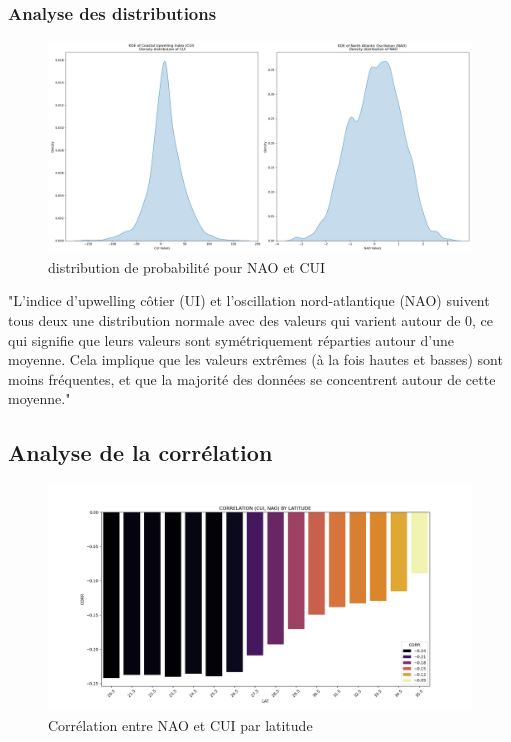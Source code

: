 \subsubsection{Analyse des distributions}

\begin{figure}[H]
\centering
\includegraphics[scale=0.3]{kde_nao_cui.png}
\caption{distribution de probabilité pour NAO et CUI}
\end{figure}

"L'indice d'upwelling côtier (UI) et l'oscillation nord-atlantique (NAO) suivent tous deux une distribution normale avec des valeurs qui varient autour de 0, ce qui signifie que leurs valeurs sont symétriquement réparties autour d'une moyenne. Cela implique que les valeurs extrêmes (à la fois hautes et basses) sont moins fréquentes, et que la majorité des données se concentrent autour de cette moyenne."

\subsection{Analyse de la corrélation}
\begin{figure}[H]
\centering
\includegraphics[scale=0.3]{corr.png}
\caption{Corrélation entre NAO et CUI par latitude}
\end{figure}

